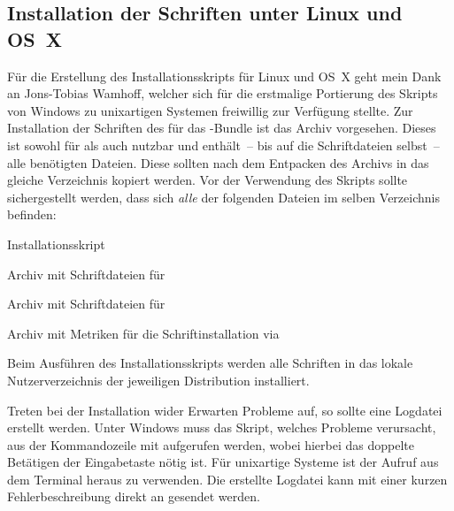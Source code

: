 \subsection{Installation der Schriften unter Linux und OS~X}
\label{sec:install:fonts:unix}
Für die Erstellung des Installationsskripts für Linux und OS~X geht mein Dank 
an Jons-Tobias Wamhoff, welcher sich für die erstmalige Portierung des Skripts 
von Windows zu unixartigen Systemen freiwillig zur Verfügung stellte.
Zur Installation der Schriften des \CDs für das \TUDScript-Bundle ist das Archiv
%
{} vorgesehen. Dieses ist sowohl für 
 als auch  
nutzbar und enthält~-- bis auf die Schriftdateien selbst~-- alle benötigten 
Dateien. Diese sollten nach dem Entpacken des Archivs in das gleiche 
Verzeichnis kopiert werden. Vor der Verwendung des Skripts 
 sollte sichergestellt werden, dass sich 
\emph{alle} der folgenden Dateien im selben Verzeichnis befinden:
%
%
\begin{description}[labelwidth=\tempdim,labelsep=1em]
  \item[\File{tudscrfonts\_install.sh}]Installationsskript
  \item[\File{Univers\_PS.zip}]Archiv mit Schriftdateien für \Univers
  \item[\File{DIN\_Bd\_PS.zip}]Archiv mit Schriftdateien für \DIN
  \item[\File{tudscrfonts.zip}]Archiv mit Metriken für die
    Schriftinstallation via 
\end{description}
%
Beim Ausführen des Installationsskripts werden alle Schriften in das lokale 
Nutzerverzeichnis der jeweiligen Distribution installiert.


Treten bei der Installation wider Erwarten Probleme auf, so sollte eine 
Logdatei erstellt werden. Unter Windows muss das Skript, welches Probleme 
verursacht, aus der Kommandozeile mit
 aufgerufen werden, wobei hierbei 
das doppelte Betätigen der Eingabetaste nötig ist. Für unixartige Systeme 
ist der Aufruf  aus dem Terminal 
heraus zu verwenden. Die erstellte Logdatei kann mit einer kurzen 
Fehlerbeschreibung direkt an \Email{\tudscrmail} gesendet werden.



